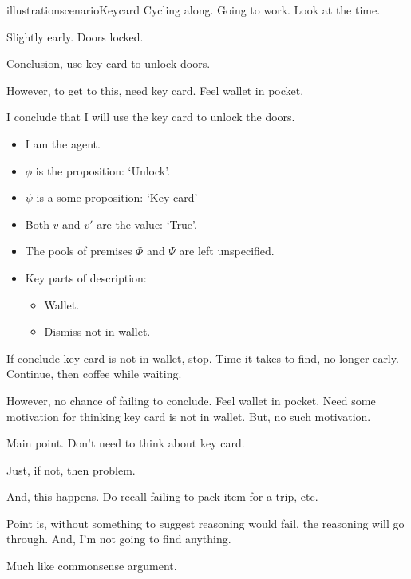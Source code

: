 \begin{note}
  \begin{restatable}{illustration}{scenarioKeycard}
    Cycling along.
    Going to work.
    Look at the time.

    Slightly early.
    Doors locked.

    Conclusion, use key card to unlock doors.

    However, to get to this, need key card.
    Feel wallet in pocket.

    I conclude that I will use the key card to unlock the doors.
  \end{restatable}

    \begin{itemize}[noitemsep]
  \item
    I am the agent.
  \item
    \(\phi\) is the proposition: `Unlock'.
  \item
    \(\psi\) is a some proposition: `Key card'
  \item
    Both \(v\) and \(v'\) are the value: `True'.
  \item
    The pools of premises \(\Phi\) and \(\Psi\) are left unspecified.
  \item
    Key parts of description:
    \begin{itemize}
    \item
      Wallet.
    \item
      Dismiss not in wallet.
    \end{itemize}
  \end{itemize}

  If conclude key card is not in wallet, stop.
  Time it takes to find, no longer early.
  Continue, then coffee while waiting.

  However, no chance of failing to conclude.
  Feel wallet in pocket.
  Need some motivation for thinking key card is not in wallet.
  But, no such motivation.
\end{note}

\begin{note}
  Main point.
  Don't need to think about key card.

  Just, if not, then problem.

  And, this happens.
  Do recall failing to pack item for a trip, etc.

  Point is, without something to suggest reasoning would fail, the reasoning will go through.
  And, I'm not going to find anything.

  Much like commonsense argument.
\end{note}


